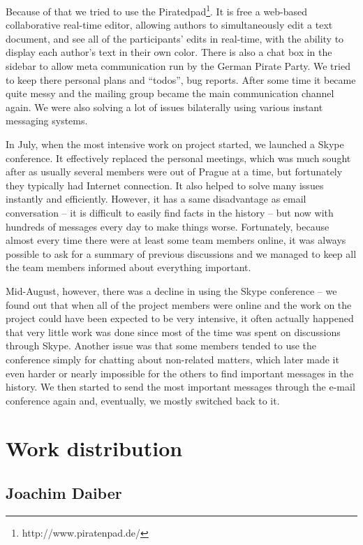 {Because of that we tried to use the Piratedpad\footnote{http://www.piratenpad.de/}. It is free a web-based collaborative real-time editor, allowing authors to simultaneously edit a text document, and see all of the participants' edits in real-time, with the ability to display each author's text in their own color. There is also a chat box in the sidebar to allow meta communication run by the German Pirate Party. We tried to keep there personal plans and ``todos'', bug reports. After some time it became quite messy and the mailing group became the main communication channel again. We were also solving a lot of issues bilaterally using various instant messaging systems.

In July, when the most intensive work on project started, we launched a Skype conference. It effectively replaced the personal meetings, which was much sought after as usually several members were out of Prague at a time, but fortunately they typically had Internet connection.
It also helped to solve many issues instantly and efficiently.
However, it has a same disadvantage as email conversation -- it is difficult to easily find facts in the history -- but now with hundreds of messages every day to make things worse.
Fortunately, because almost every time there were at least some team members online, it was always possible to ask for a summary of previous discussions and we managed to keep all the team members informed about everything important.

Mid-August, however, there was a decline in using the Skype conference -- we found out that when all of the project members were online and the work on the project could have been expected to be very intensive, it often actually happened that very little work was done since most of the time was spent on discussions through Skype.
Another issue was that some members tended to use the conference simply for chatting about non-related matters, %
which later made it even harder or nearly impossible for the others to find important messages in the history.
We then started to send the most important messages through the e-mail conference again and, eventually, we mostly switched back to it.


\section{Work distribution}

\subsection*{Joachim Daiber}

}
